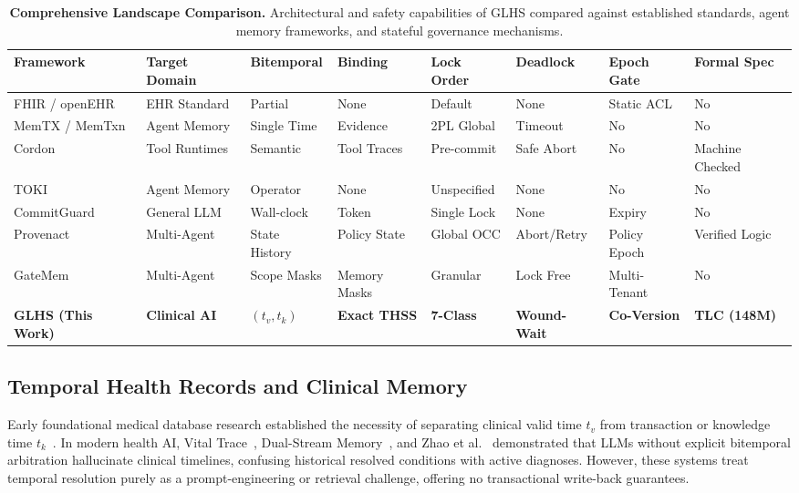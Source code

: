 \documentclass[11pt,a4paper]{article}
\begin{document}
\begin{table}[t]
\centering
\scriptsize
\caption{\textbf{Comprehensive Landscape Comparison.} Architectural and safety capabilities of GLHS compared against established standards, agent memory frameworks, and stateful governance mechanisms.}
\label{tab:landscape}
\begin{tabularx}{\textwidth}{>{\raggedright\arraybackslash}p{2.3cm} >{\centering\arraybackslash}p{1.6cm} >{\centering\arraybackslash}p{1.4cm} >{\centering\arraybackslash}p{1.4cm} >{\centering\arraybackslash}p{1.4cm} >{\centering\arraybackslash}p{1.4cm} >{\centering\arraybackslash}p{1.5cm} >{\raggedright\arraybackslash}X}
\toprule
\textbf{Framework} & \textbf{Target Domain} & \textbf{Bitemporal} & \textbf{Binding} & \textbf{Lock Order} & \textbf{Deadlock} & \textbf{Epoch Gate} & \textbf{Formal Spec}\\
\midrule
FHIR / openEHR~\cite{fhirprov,openehr} & EHR Standard & Partial & None & Default & None & Static ACL & No\\
MemTX / MemTxn~\cite{memtx,memtxn} & Agent Memory & Single Time & Evidence & 2PL Global & Timeout & No & No\\
Cordon~\cite{cordon} & Tool Runtimes & Semantic & Tool Traces & Pre-commit & Safe Abort & No & Machine Checked\\
TOKI~\cite{toki} & Agent Memory & Operator & None & Unspecified & None & No & No\\
CommitGuard~\cite{temporaryauth} & General LLM & Wall-clock & Token & Single Lock & None & Expiry & No\\
Provenact~\cite{statefulgov} & Multi-Agent & State History & Policy State & Global OCC & Abort/Retry & Policy Epoch & Verified Logic\\
GateMem~\cite{gatemem} & Multi-Agent & Scope Masks & Memory Masks & Granular & Lock Free & Multi-Tenant & No\\
\midrule
\textbf{GLHS (This Work)} & \textbf{Clinical AI} & \textbf{$(t_v, t_k)$} & \textbf{Exact THSS} & \textbf{7-Class} & \textbf{Wound-Wait} & \textbf{Co-Version} & \textbf{TLC (148M)}\\
\bottomrule
\end{tabularx}
\end{table}

\subsection{Temporal Health Records and Clinical Memory}
Early foundational medical database research established the necessity of separating clinical valid time $t_v$ from transaction or knowledge time $t_k$~\cite{gabrieli1992,kouramajian1994,kumar1998}. In modern health AI, Vital Trace~\cite{vitaltrace}, Dual-Stream Memory~\cite{dualstream}, and Zhao et al.~\cite{zhao2026} demonstrated that LLMs without explicit bitemporal arbitration hallucinate clinical timelines, confusing historical resolved conditions with active diagnoses. However, these systems treat temporal resolution purely as a prompt-engineering or retrieval challenge, offering no transactional write-back guarantees.
\end{document}
